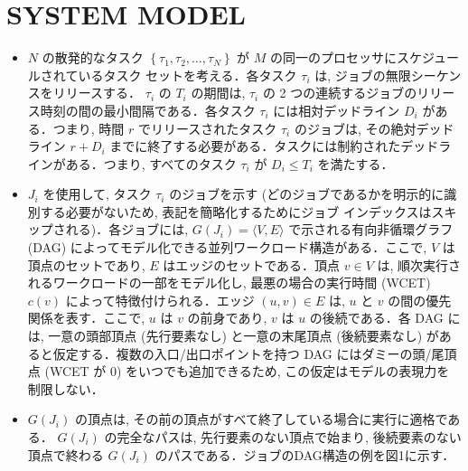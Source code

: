 
\section{SYSTEM MODEL}
\label{sec: system model}

\begin{frame}{}
    \begin{itemize}
        \item $N$ の散発的なタスク $\left\{\tau_{1}, \tau_{2}, \ldots, \tau_{N}\right\}$ が $M$ の同一のプロセッサにスケジュールされているタスク セットを考える．各タスク $\tau_{i}$ は, ジョブの無限シーケンスをリリースする． $\tau_{i}$ の $T_{i}$ の期間は, $\tau_{i}$ の 2 つの連続するジョブのリリース時刻の間の最小間隔である．各タスク $\tau_{i}$ には相対デッドライン $D_{i}$ がある．つまり, 時間 $r$ でリリースされたタスク $\tau_{i}$ のジョブは, その絶対デッドライン $r+D_{i}$ までに終了する必要がある．タスクには制約されたデッドラインがある．つまり, すべてのタスク $\tau_{i}$ が $D_{i} \leq T_{i}$ を満たする．
    \end{itemize}
\end{frame}

\begin{frame}{}
    \begin{itemize}
        \item  $J_{i}$ を使用して, タスク $\tau_{i}$ のジョブを示す (どのジョブであるかを明示的に識別する必要がないため, 表記を簡略化するためにジョブ インデックスはスキップされる)．各ジョブには, $G\left(J_{i}\right)=\langle V, E\rangle$ で示される有向非循環グラフ (DAG) によってモデル化できる並列ワークロード構造がある．ここで, $V$ は頂点のセットであり, $E$ はエッジのセットである．頂点 $v \in V$ は, 順次実行されるワークロードの一部をモデル化し, 最悪の場合の実行時間 (WCET) $c(v)$ によって特徴付けられる．エッジ $(u, v) \in E$ は, $u$ と $v$ の間の優先関係を表す．ここで, $u$ は $v$ の前身であり, $v$ は $u$ の後続である．各 DAG には, 一意の頭部頂点 (先行要素なし) と一意の末尾頂点 (後続要素なし) があると仮定する．複数の入口/出口ポイントを持つ DAG にはダミーの頭/尾頂点 (WCET が 0) をいつでも追加できるため, この仮定はモデルの表現力を制限しない．
    \end{itemize}
\end{frame}

\begin{frame}{}
    \begin{itemize}
        \item $G\left(J_{i}\right)$ の頂点は, その前の頂点がすべて終了している場合に実行に適格である． $G\left(J_{i}\right)$ の完全なパスは, 先行要素のない頂点で始まり, 後続要素のない頂点で終わる $G\left(J_{i}\right)$ のパスである．ジョブのDAG構造の例を図1に示す．
    \end{itemize}
\end{frame}

